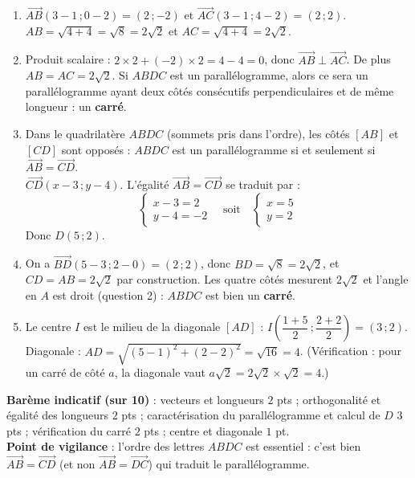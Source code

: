 \documentclass[11pt]{article}
\begin{document}
\begin{corrige}
\begin{enumerate}
\item $\overrightarrow{AB}(3-1\,;0-2) = (2\,;-2)$ et $\overrightarrow{AC}(3-1\,;4-2) = (2\,;2)$.\\
$AB = \sqrt{4+4} = \sqrt{8} = 2\sqrt{2}$ et $AC = \sqrt{4+4} = 2\sqrt{2}$.
\item Produit scalaire : $2\times 2 + (-2)\times 2 = 4-4 = 0$, donc $\overrightarrow{AB}\perp\overrightarrow{AC}$. De plus $AB = AC = 2\sqrt{2}$. Si $ABDC$ est un parallélogramme, alors ce sera un parallélogramme ayant deux côtés consécutifs perpendiculaires et de même longueur : un \textbf{carré}.
\item Dans le quadrilatère $ABDC$ (sommets pris dans l'ordre), les côtés $[AB]$ et $[CD]$ sont opposés : $ABDC$ est un parallélogramme si et seulement si $\overrightarrow{AB} = \overrightarrow{CD}$.\\
$\overrightarrow{CD}(x-3\,;y-4)$. L'égalité $\overrightarrow{AB} = \overrightarrow{CD}$ se traduit par :
\[ \begin{cases} x-3 = 2 \\ y-4 = -2 \end{cases} \quad\text{soit}\quad \begin{cases} x = 5 \\ y = 2 \end{cases} \]
Donc $D(5\,;2)$.
\item On a $\overrightarrow{BD}(5-3\,;2-0) = (2\,;2)$, donc $BD = \sqrt{8} = 2\sqrt{2}$, et $CD = AB = 2\sqrt{2}$ par construction. Les quatre côtés mesurent $2\sqrt{2}$ et l'angle en $A$ est droit (question 2) : $ABDC$ est bien un \textbf{carré}.
\item Le centre $I$ est le milieu de la diagonale $[AD]$ : $I\left(\dfrac{1+5}{2}\,;\dfrac{2+2}{2}\right) = (3\,;2)$.\\
Diagonale : $AD = \sqrt{(5-1)^2+(2-2)^2} = \sqrt{16} = 4$. (Vérification : pour un carré de côté $a$, la diagonale vaut $a\sqrt{2} = 2\sqrt{2}\times\sqrt{2} = 4$.)
\end{enumerate}
\textbf{Barème indicatif (sur 10)} : vecteurs et longueurs $2$ pts ; orthogonalité et égalité des longueurs $2$ pts ; caractérisation du parallélogramme et calcul de $D$ $3$ pts ; vérification du carré $2$ pts ; centre et diagonale $1$ pt.\\
\textbf{Point de vigilance} : l'ordre des lettres $ABDC$ est essentiel : c'est bien $\overrightarrow{AB} = \overrightarrow{CD}$ (et non $\overrightarrow{AB} = \overrightarrow{DC}$) qui traduit le parallélogramme.
\end{corrige}
\end{document}
